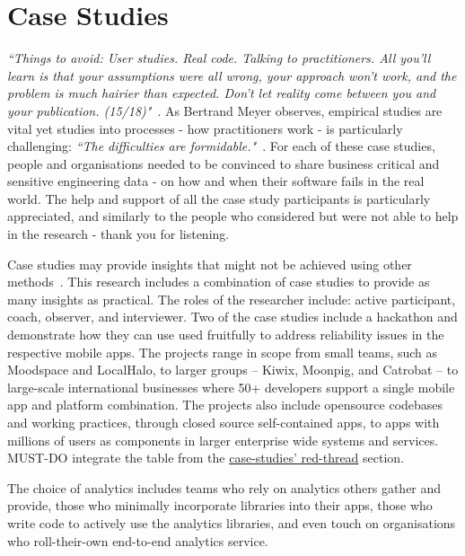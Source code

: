 \chapter{Case Studies}
\label{chapter-case-studies}

\emph{``Things to avoid: User studies. Real code. Talking to practitioners. All you'll learn is that your assumptions were all wrong, your approach won't work, and the problem is much hairier than expected. Don't let reality come between you and your publication. (15/18)"}~\citep{zeller2021_tweet_the_devils_guide_to_incremental_research_15_18}. As Bertrand Meyer observes, empirical studies are vital yet studies into processes - how practitioners work - is particularly challenging: \emph{``The difficulties are formidable."}~\citep{meyer2018_towards_empirical_answers_to_important_engineering_questions}. For each of these case studies, people and organisations needed to be convinced to share business critical and sensitive engineering data - on how and when their software fails in the real world. The help and support of all the case study participants is particularly appreciated, and similarly to the people who considered but were not able to help in the research - thank you for listening.

Case studies may provide insights that might not be achieved using other methods~\citep{rowley2002_using_case_studies_in_research}. This research includes a combination of case studies to provide as many insights as practical. The roles of the researcher include: active participant, coach, observer, and interviewer. Two of the case studies include a hackathon and demonstrate how they can use used fruitfully to address reliability issues in the respective mobile apps. The projects range in scope from small teams, such as Moodspace and LocalHalo, to larger groups -- Kiwix, Moonpig, and Catrobat -- to large-scale international businesses where 50+ developers support a single mobile app and platform combination. The projects also include opensource codebases and working practices, through closed source self-contained apps, to apps with millions of users as components in larger enterprise wide systems and services. 
%
MUST-DO integrate the table from the \href{section-case-studies-red-thread}{case-studies' red-thread} section.

The choice of analytics includes teams who rely on analytics others gather and provide, those who minimally incorporate libraries into their apps, those who write code to actively use the analytics libraries, and even touch on organisations who roll-their-own end-to-end analytics service.


